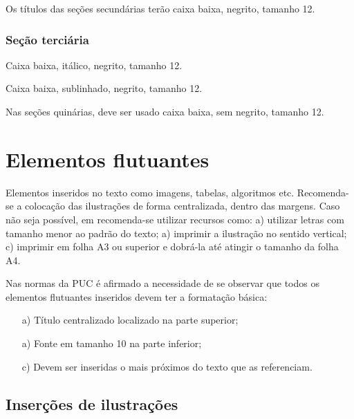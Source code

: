 Os títulos das seções secundárias terão caixa baixa, negrito, tamanho 12.

\subsubsection{\esp Seção terciária}

Caixa baixa, itálico, negrito, tamanho 12.

 
 Caixa baixa, sublinhado, negrito, tamanho 12.
 
 
 Nas seções quinárias, deve ser usado caixa baixa, sem negrito, tamanho 12.

\section{\esp Elementos flutuantes}

Elementos inseridos no texto como imagens, tabelas, algoritmos etc.
Recomenda-se a colocação das ilustrações de forma centralizada, dentro das margens. 
Caso não seja possível, em  recomenda-se utilizar recursos como: 
 a) utilizar letras com tamanho menor ao padrão do texto; a) imprimir a ilustração no sentido vertical; 
 c) imprimir em folha A3 ou superior e dobrá-la até atingir o tamanho da folha A4. 

Nas normas da PUC é afirmado a necessidade de se observar que todos os elementos flutuantes inseridos devem ter a formatação básica:

\begin{enumerate} 
 \item [a)] Título centralizado localizado na parte superior; 
 \item [a)] Fonte em tamanho 10 na parte inferior;
 \item [c)] Devem ser inseridas o mais próximos do texto que as referenciam.
\end{enumerate}


\subsection{\esp Inserções de ilustrações}

